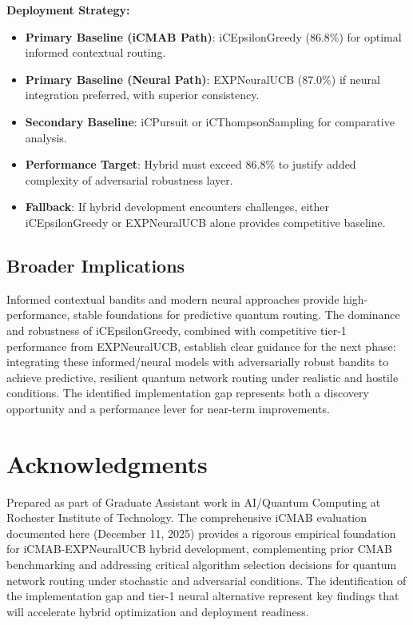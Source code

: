 \documentclass[12pt,a4paper]{article}
\begin{document}
\textbf{Deployment Strategy:}
\begin{itemize}
\item \textbf{Primary Baseline (iCMAB Path)}: iCEpsilonGreedy (86.8\%) for optimal informed contextual routing.
\item \textbf{Primary Baseline (Neural Path)}: EXPNeuralUCB (87.0\%) if neural integration preferred, with superior consistency.
\item \textbf{Secondary Baseline}: iCPursuit or iCThompsonSampling for comparative analysis.
\item \textbf{Performance Target}: Hybrid must exceed 86.8\% to justify added complexity of adversarial robustness layer.
\item \textbf{Fallback}: If hybrid development encounters challenges, either iCEpsilonGreedy or EXPNeuralUCB alone provides competitive baseline.
\end{itemize}

\subsection{Broader Implications}

Informed contextual bandits and modern neural approaches provide high-performance, stable foundations for predictive quantum routing. The dominance and robustness of iCEpsilonGreedy, combined with competitive tier-1 performance from EXPNeuralUCB, establish clear guidance for the next phase: integrating these informed/neural models with adversarially robust bandits to achieve predictive, resilient quantum network routing under realistic and hostile conditions. The identified implementation gap represents both a discovery opportunity and a performance lever for near-term improvements.

\newpage
\section{Acknowledgments}

Prepared as part of Graduate Assistant work in AI/Quantum Computing at Rochester Institute of Technology. The comprehensive iCMAB evaluation documented here (December 11, 2025) provides a rigorous empirical foundation for iCMAB-EXPNeuralUCB hybrid development, complementing prior CMAB benchmarking and addressing critical algorithm selection decisions for quantum network routing under stochastic and adversarial conditions. The identification of the implementation gap and tier-1 neural alternative represent key findings that will accelerate hybrid optimization and deployment readiness.
\end{document}

